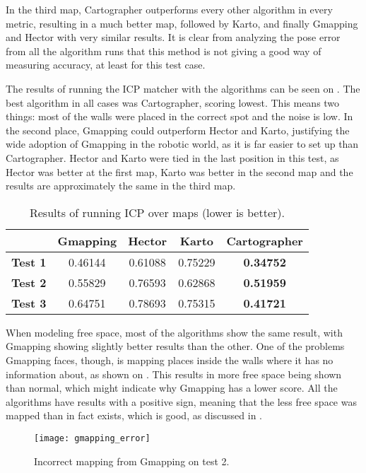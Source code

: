 In the third map, Cartographer outperforms every other algorithm in every metric, resulting in a much better map, followed by Karto, and finally Gmapping and Hector with very similar results. It is clear from analyzing the pose error from all the algorithm runs that this method is not giving a good way of measuring accuracy, at least for this test case.

The results of running the ICP matcher with the algorithms can be seen on . The best algorithm in all cases was Cartographer, scoring lowest. This means two things: most of the walls were placed in the correct spot and the noise is low. In the second place, Gmapping could outperform Hector and Karto, justifying the wide adoption of Gmapping in the robotic world, as it is far easier to set up than Cartographer. Hector and Karto were tied in the last position in this test, as Hector was better at the first map, Karto was better in the second map and the results are approximately the same in the third map.

\begin{table}[!ht]
\centering
\renewcommand*{\arraystretch}{1.1}
\begin{tabular}{c|c|c|c|c}
& \textbf{Gmapping} & \textbf{Hector} & \textbf{Karto} & \textbf{Cartographer} \\ \hline
\textbf{Test 1} & 0.46144 & 0.61088 & 0.75229 & \textbf{0.34752} \\
\textbf{Test 2} & 0.55829 & 0.76593 & 0.62868 & \textbf{0.51959} \\
\textbf{Test 3} & 0.64751 & 0.78693 & 0.75315 & \textbf{0.41721} \\
 \hline
\end{tabular}
\caption{Results of running ICP over maps (lower is better).}
\label{tab:results_icp}
\end{table}

When modeling free space, most of the algorithms show the same result, with Gmapping showing slightly better results than the other. One of the problems Gmapping faces, though, is mapping places inside the walls where it has no information about, as shown on . This results in more free space being shown than normal, which might indicate why Gmapping has a lower score. All the algorithms have results with a positive sign, meaning that the less free space was mapped than in fact exists, which is good, as discussed in .

\begin{figure}[!ht]
     \centering
     \texttt{[image: gmapping\_error]}
     \caption{Incorrect mapping from Gmapping on test 2.}
     \label{fig:gmapping_error}
\end{figure}

